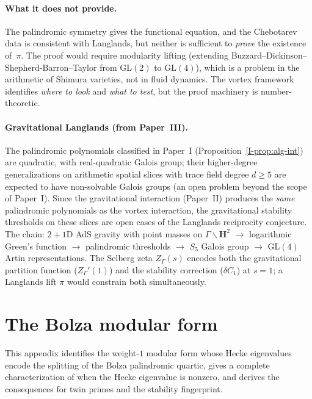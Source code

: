 \paragraph{What it does not provide.}
The palindromic symmetry gives the functional equation, and
the Chebotarev data is consistent with Langlands, but neither
is sufficient to \emph{prove} the existence of~$\pi$.
The proof would require modularity lifting
(extending Buzzard--Dickinson--Shepherd-Barron--Taylor
from $\mathrm{GL}(2)$ to $\mathrm{GL}(4)$), which is
a problem in the arithmetic of Shimura varieties, not in
fluid dynamics.
The vortex framework identifies \emph{where to look}
and \emph{what to test}, but the proof machinery is
number-theoretic.


\paragraph{Gravitational Langlands (from Paper~III).}
The palindromic polynomials classified in Paper~I
(Proposition~\ref{I-prop:alg-int}) are quadratic, with
real-quadratic Galois group; their higher-degree
generalizations on arithmetic spatial slices with
trace field degree $d \ge 5$ are expected to have
non-solvable Galois groups (an open problem beyond the
scope of Paper~I).
Since the gravitational interaction (Paper~II)
produces the \emph{same} palindromic polynomials as the vortex
interaction, the gravitational stability thresholds on these
slices are open cases of the Langlands reciprocity conjecture.
The chain: $2{+}1$D AdS gravity with point masses on
$\Gamma\backslash\mathbf{H}^2$ $\to$ logarithmic Green's
function $\to$ palindromic thresholds $\to$ $S_5$ Galois
group $\to$ $\mathrm{GL}(4)$ Artin representations.
The Selberg zeta $Z_\Gamma(s)$ encodes both the gravitational
partition function ($Z_\Gamma'(1)$) and the stability
correction ($\delta C_1$) at $s = 1$; a Langlands lift
$\pi$ would constrain both simultaneously.



\section{The Bolza modular form}
\label{sec:bolza-modular}

This appendix identifies the weight-$1$ modular form whose
Hecke eigenvalues encode the splitting of the Bolza
palindromic quartic, gives a complete characterization of
when the Hecke eigenvalue is nonzero, and derives the
consequences for twin primes and the stability fingerprint.


